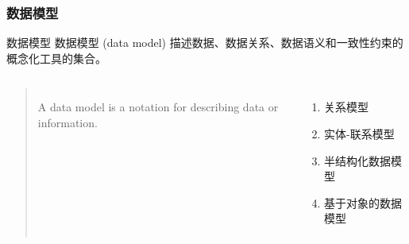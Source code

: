 \documentclass[aspectratio=169, 14pt]{beamer}
\begin{document}
\begin{frame}
	\frametitle{数据模型}
	\begin{block}{数据模型}
		数据模型 (data model) 描述数据、数据关系、数据语义和一致性约束的概念化工具的集合。
	\end{block}

	\begin{columns}
		\begin{quote}
			A data model is a notation for describing data or information.
		\end{quote}
		\begin{enumerate}
			\item 关系模型
			\item 实体-联系模型
			\item 半结构化数据模型
			\item 基于对象的数据模型
		\end{enumerate}
	\end{columns}

\end{frame}
\end{document}
